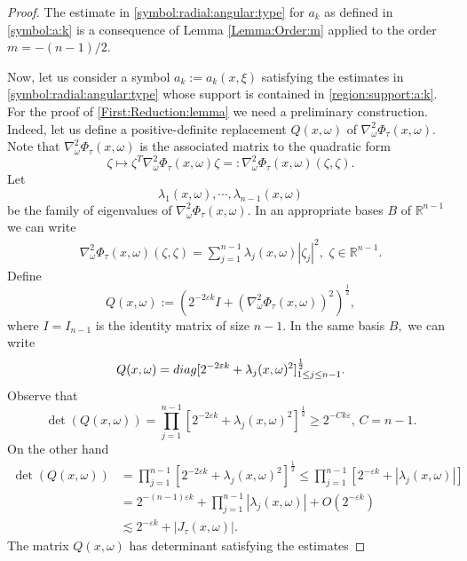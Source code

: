 \documentclass[12pt, reqno]{amsart}
\theoremstyle{definition}
\theoremstyle{remark}
\numberwithin{equation}{section}
\begin{document}
\begin{proof} The estimate in \eqref{symbol:radial:angular:type} for $a_k$ as defined in \eqref{symbol:a:k}  is a consequence of Lemma \ref{Lemma:Order:m} applied to the order $m=-(n-1)/2.$

Now, let us consider a symbol $a_{k}:=a_k(x,\xi)$ satisfying the estimates in \eqref{symbol:radial:angular:type} whose support is contained in \eqref{region:support:a:k}. For the proof of \eqref{First:Reduction:lemma} we need a preliminary construction. Indeed, let us define a positive-definite replacement $Q(x,\omega)$ of $\nabla_\omega^2\Phi_\tau(x,\omega).$ Note that  $\nabla_\omega^2\Phi_\tau(x,\omega)$   is the associated  matrix to the quadratic form
$$\zeta\mapsto \zeta^{T}\nabla_\omega^2\Phi_\tau(x,\omega)\zeta=:\nabla_\omega^2\Phi_\tau(x,\omega)(\zeta,\zeta).$$
 Let $$\lambda_{1}(x,\omega),\cdots, \lambda_{n-1}(x,\omega)$$ be the family of eigenvalues of $\nabla_\omega^2\Phi_\tau(x,\omega).$
In an appropriate bases $B$ of $\mathbb{R}^{n-1}$ we can write
\begin{align*}
    \nabla_\omega^2\Phi_\tau(x,\omega)(\zeta,\zeta)=\sum_{j=1}^{n-1}\lambda_{j}(x,\omega)|\zeta_j|^{2},\,\,\zeta\in \mathbb{R}^{n-1}.
\end{align*}
Define
\begin{equation}
    Q(x,\omega):=(2^{-2\varepsilon k}I+( \nabla_\omega^2\Phi_\tau(x,\omega))^2)^{\frac{1}{2}},
\end{equation}where $I=I_{n-1}$ is the identity matrix of size $n-1.$ 
In the same basis $B,$ we can write
\begin{align*}
    Q(x,\omega)=\textnormal{diag}[2^{-2\varepsilon k}+\lambda_j(x,\omega)^2]_{1\leq j\leq n-1}^{\frac{1}{2}}.
\end{align*}
Observe that
\begin{equation}
    \det(Q(x,\omega))=\prod_{j=1}^{n-1}[2^{-2\varepsilon k}+\lambda_j(x,\omega)^2]^{\frac{1}{2}}\geq 2^{-Ck\varepsilon}, \,C=n-1.
\end{equation}On the other hand
\begin{align*}
     \det(Q(x,\omega)) &=\prod_{j=1}^{n-1}[2^{-2\varepsilon k}+\lambda_j(x,\omega)^2]^{\frac{1}{2}}\leq \prod_{j=1}^{n-1}[2^{- \varepsilon k}+|\lambda_j(x,\omega)|]\\
     &=2^{-(n-1)\varepsilon k}+\prod_{j=1}^{n-1}|\lambda_j(x,\omega)|+O(2^{-\varepsilon k})\\
     &\lesssim 2^{-\varepsilon k}+|J_\tau(x,\omega)|.
\end{align*}The matrix $Q(x,\omega)$ has determinant satisfying the estimates

\end{proof}
\end{document}
